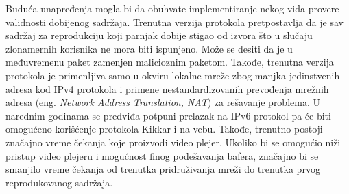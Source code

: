 \documentclass[12pt,oneside]{memoir}
\begin{document}
Buduća unapređenja mogla bi da obuhvate implementiranje nekog vida provere validnosti dobijenog sadržaja. Trenutna verzija protokola pretpostavlja da je sav sadržaj za reprodukciju koji parnjak dobije stigao od izvora što u slučaju zlonamernih korisnika ne mora biti ispunjeno. Može se desiti da je u međuvremenu paket zamenjen malicioznim paketom. Takođe, trenutna verzija protokola je primenljiva samo u okviru lokalne mreže zbog manjka jedinstvenih adresa kod IPv4 protokola i primene nestandardizovanih prevođenja mrežnih adresa (eng. \textit{Network Address Translation, NAT}) za rešavanje problema. U narednim godinama se predviđa potpuni prelazak na IPv6 protokol pa će biti omogućeno korišćenje protokola Kikkar i na vebu. Takođe, trenutno postoji značajno vreme čekanja koje proizvodi video plejer. Ukoliko bi se omogućio niži pristup video plejeru i mogućnost finog podešavanja bafera, značajno bi se smanjilo vreme čekanja od trenutka pridruživanja mreži do trenutka prvog reprodukovanog sadržaja. 



\literatura

\backmatter

\end{document}
